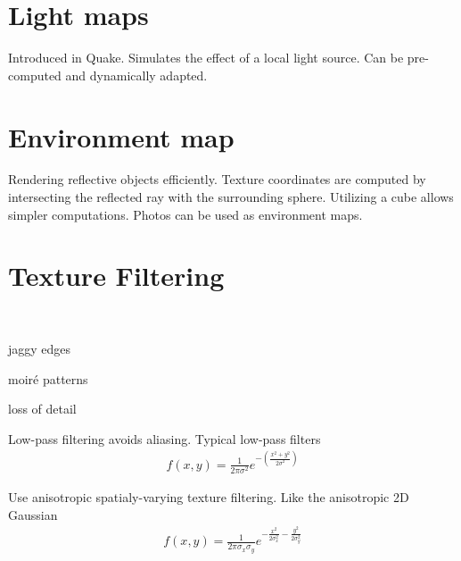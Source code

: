 \begin{compactdesc}
		\section{Light maps}
		Introduced in Quake. Simulates the effect of a local light source. Can be pre-computed and dynamically adapted. 
		\section{Environment map}
		Rendering reflective objects efficiently. Texture coordinates are computed by intersecting the reflected ray with the surrounding sphere.
	Utilizing a cube allows simpler computations. Photos can be used as environment maps.
\section{Texture Filtering}
	\item[\lp{aliasing in computer graphics}]\hfill\\
		\begin{enumerate*}[label=\protect\circled{\arabic*},itemjoin=]
			\item jaggy edges\\
			\item moiré patterns\\
			\item loss of detail
		\end{enumerate*}
		Low-pass filtering avoids aliasing. Typical low-pass filters
		\begin{gather*}
			f(x,y)=\frac{1}{2\pi\sigma^2}e^{-\left( \frac{x^2+y^2}{2\sigma^2} \right)}
		\end{gather*}
	\item[\lp{Filtering in texture vs. image space}] Use anisotropic spatialy-varying texture filtering. Like the anisotropic 2D Gaussian
		\begin{gather*}
			f(x,y)=\frac{1}{2\pi \sigma_x\sigma_y}e^{-\frac{x^2}{2\sigma_{x}^{2}}-\frac{y^2}{2\sigma_{y}^{2}}}
		\end{gather*}

\end{compactdesc}
